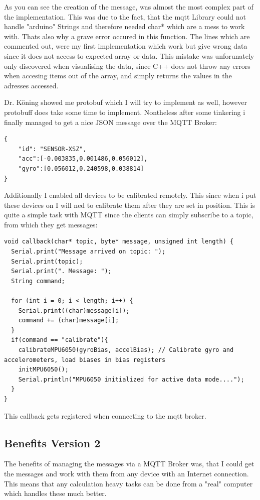As you can see the creation of the message, was almost the most complex part of the implementation. This was due to the fact, that the mqtt Library could not handle "arduino" Strings and therefore needed char* which are a mess to work with.  Thats also why a grave error occured in this function. The lines which are commented out, were my first implementation which work but give wrong data since it does not access to expected array or data.
This mistake was unforunately only discovered when visualising the data, since C++ does not throw any errors when accesing items out of the array, and simply returns the values in the adresses accessed.

Dr. Köning showed me protobuf which I will try to implement as well, however protobuff does take some time to implement. Nontheless after some tinkering i finally managed to get a nice JSON message over the MQTT Broker: 
\begin{lstlisting}
{ 
    "id": "SENSOR-XSZ", 
    "acc":[-0.003835,0.001486,0.056012],
    "gyro":[0.056012,0.240598,0.038814]
}
\end{lstlisting}

Additionally I enabled all devices to be calibrated remotely. This since when i put these devices on I will ned to calibrate them after they are set in position. This is quite a simple task with MQTT since the clients can simply subscribe to a topic, from which they get messages: 

\begin{lstlisting}
void callback(char* topic, byte* message, unsigned int length) {
  Serial.print("Message arrived on topic: ");
  Serial.print(topic);
  Serial.print(". Message: ");
  String command;
  
  for (int i = 0; i < length; i++) {
    Serial.print((char)message[i]);
    command += (char)message[i];
  }
  if(command == "calibrate"){
    calibrateMPU6050(gyroBias, accelBias); // Calibrate gyro and accelerometers, load biases in bias registers  
    initMPU6050(); 
    Serial.println("MPU6050 initialized for active data mode....");
  }
}
\end{lstlisting}
This callback gets registered when connecting to the mqtt broker.


\subsection{Benefits Version 2}

The benefits of managing the messages via a MQTT Broker was, that I could get the messages and work with them from any device with an Internet connection. This means that any calculation heavy tasks can be done from a "real" computer which handles these much better. 

